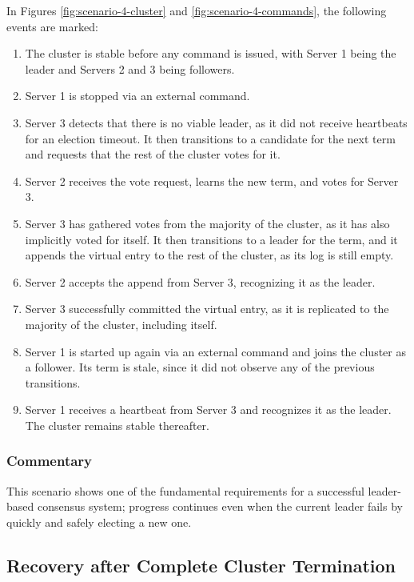 In Figures \ref{fig:scenario-4-cluster} and \ref{fig:scenario-4-commands}, the following events are marked:
\begin{enumerate}
    \item The cluster is stable before any command is issued, with Server 1 being the leader and Servers 2 and 3 being followers.
    \item Server 1 is stopped via an external command.
    \item Server 3 detects that there is no viable leader, as it did not receive heartbeats for an election timeout. It then transitions to a candidate for the next term and requests that the rest of the cluster votes for it.
    \item Server 2 receives the vote request, learns the new term, and votes for Server 3.
    \item Server 3 has gathered votes from the majority of the cluster, as it has also implicitly voted for itself. It then transitions to a leader for the term, and it appends the virtual entry to the rest of the cluster, as its log is still empty.
    \item Server 2 accepts the append from Server 3, recognizing it as the leader.
    \item Server 3 successfully committed the virtual entry, as it is replicated to the majority of the cluster, including itself.
    \item Server 1 is started up again via an external command and joins the cluster as a follower. Its term is stale, since it did not observe any of the previous transitions.
    \item Server 1 receives a heartbeat from Server 3 and recognizes it as the leader. The cluster remains stable thereafter.
\end{enumerate}

\subsubsection{Commentary}

This scenario shows one of the fundamental requirements for a successful leader-based consensus system; progress continues even when the current leader fails by quickly and safely electing a new one.

\subsection{Recovery after Complete Cluster Termination}

